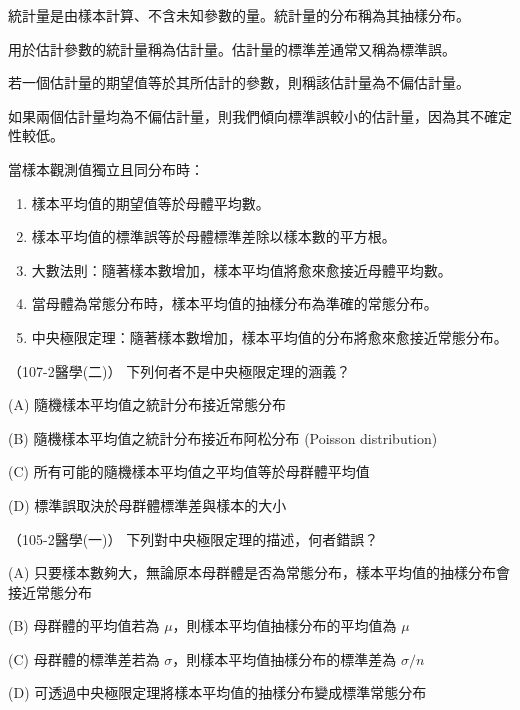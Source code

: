    \begin{takehome}
        \item 統計量是由樣本計算、不含未知參數的量。統計量的分布稱為其抽樣分布。
        \item 用於估計參數的統計量稱為估計量。估計量的標準差通常又稱為標準誤。
        \item 若一個估計量的期望值等於其所估計的參數，則稱該估計量為不偏估計量。
        \item 如果兩個估計量均為不偏估計量，則我們傾向標準誤較小的估計量，因為其不確定性較低。
        \item 當樣本觀測值獨立且同分布時：
        \begin{enumerate}
            \item 樣本平均值的期望值等於母體平均數。
            \item 樣本平均值的標準誤等於母體標準差除以樣本數的平方根。
            \item 大數法則：隨著樣本數增加，樣本平均值將愈來愈接近母體平均數。
            \item 當母體為常態分布時，樣本平均值的抽樣分布為準確的常態分布。
            \item 中央極限定理：隨著樣本數增加，樣本平均值的分布將愈來愈接近常態分布。
        \end{enumerate}
    \end{takehome}

    \bigskip

    \begin{docexam}{（107-2醫學(二)）}
        下列何者不是中央極限定理的涵義？
        
        (A) 隨機樣本平均值之統計分布接近常態分布
        
        (B) 隨機樣本平均值之統計分布接近布阿松分布 (Poisson distribution)
        
        (C) 所有可能的隨機樣本平均值之平均值等於母群體平均值
        
        (D) 標準誤取決於母群體標準差與樣本的大小
    \end{docexam}

    \pagebreak

    \begin{docexam}{（105-2醫學(一)）}
        下列對中央極限定理的描述，何者錯誤？
        
        (A) 只要樣本數夠大，無論原本母群體是否為常態分布，樣本平均值的抽樣分布會接近常態分布
        
        (B) 母群體的平均值若為 $\mu$，則樣本平均值抽樣分布的平均值為 $\mu$
        
        (C) 母群體的標準差若為 $\sigma$，則樣本平均值抽樣分布的標準差為 $\sigma/n$
        
        (D) 可透過中央極限定理將樣本平均值的抽樣分布變成標準常態分布
    \end{docexam}

